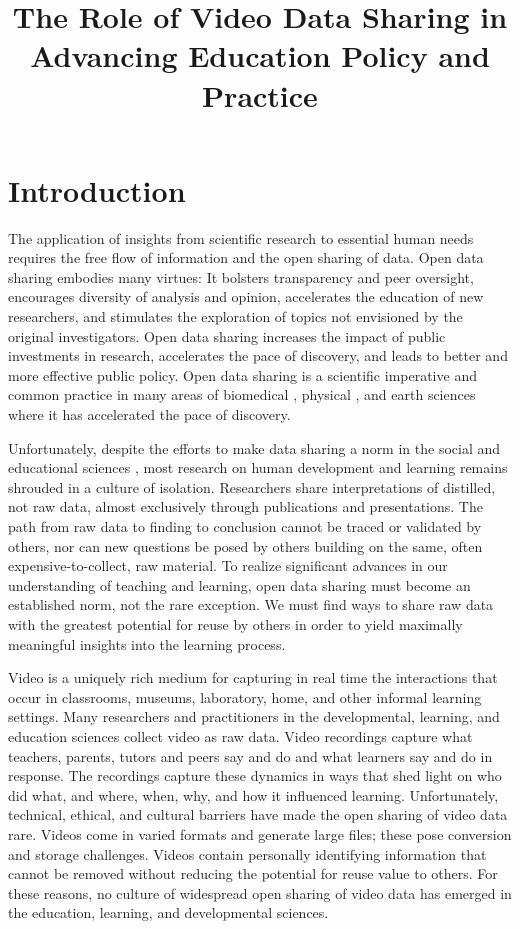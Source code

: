 \documentclass[letterpaper,man,apacite]{apa6}
\title{The Role of Video Data Sharing in Advancing Education Policy and Practice}
\begin{document}
\maketitle

\section{Introduction}

The application of insights from scientific research to essential human needs requires the free flow of information and the open sharing of data. 
Open data sharing embodies many virtues: It bolsters transparency and peer oversight, encourages diversity of analysis and opinion, accelerates the education of new researchers, and stimulates the exploration of topics not envisioned by the original investigators.
Open data sharing increases the impact of public investments in research, accelerates the pace of discovery, and leads to better and more effective public policy.
Open data sharing is a scientific imperative \cite{NSF2011,NIMH2015} and common practice in many areas of biomedical \cite{Kaye2009}, physical \cite{Young2011}, and earth sciences \cite{Kleiner2011} where it has accelerated the pace of discovery.

Unfortunately, despite the efforts to make data sharing a norm in the social and educational sciences \cite{AERA-Code-2011, Nosek2012}, most research on human development and learning \cite{Adolph2012} remains shrouded in a culture of isolation. 
Researchers share interpretations of distilled, not raw data, almost exclusively through publications and presentations.
The path from raw data to finding to conclusion cannot be traced or validated by others, nor can new questions be posed by others building on the same, often expensive-to-collect, raw material.
To realize significant advances in our understanding of teaching and learning, open data sharing must become an established norm, not the rare exception.
We must find ways to share raw data with the greatest potential for reuse by others in order to yield maximally meaningful insights into the learning process.

Video is a uniquely rich medium for capturing in real time the interactions that occur in classrooms, museums, laboratory, home, and other informal learning settings.
Many researchers and practitioners in the developmental, learning, and education sciences collect video as raw data.
Video recordings capture what teachers, parents, tutors and peers say and do and what learners say and do in response.
The recordings capture these dynamics in ways that shed light on who did what, and where, when, why, and how it influenced learning.
Unfortunately, technical, ethical, and cultural barriers have made the open sharing of video data rare.
Videos come in varied formats and generate large files; these pose conversion and storage challenges.
Videos contain personally identifying information that cannot be removed without reducing the potential for reuse value to others.
For these reasons, no culture of widespread open sharing of video data has emerged in the education, learning, and developmental sciences. 
\end{document}
